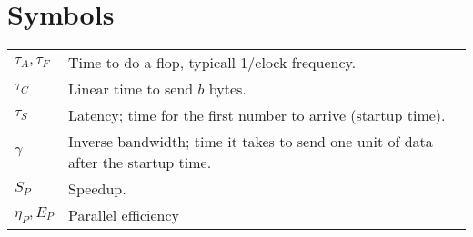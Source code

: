 
\section{Symbols} %
\label{sec:symbols}

\begin{center}
  \begin{tabular}{p{2cm}p{12cm}}
    \toprule
    $\tau_A, \tau_F$ & Time to do a flop, typicall 1/clock frequency. \\
    $\tau_C$         & Linear time to send $b$ bytes. \\
    $\tau_S$         & Latency; time for the first number to arrive (startup time). \\
    $\gamma$         & Inverse bandwidth; time it takes to send one unit of data after the startup time. \\
    $S_P$ & Speedup. \\
    $\eta_P, E_P$ & Parallel efficiency \\
    \bottomrule
  \end{tabular}
\end{center}

